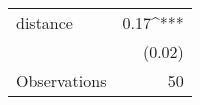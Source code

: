 \begin{tabular}{@{\hspace{5pt}}l@{\hspace{5pt}}D{.}{.}{-2} } 
\toprule
 distance & 0.17^{***} \\ 
  & (0.02) \\ 
\midrule
Observations & 50 \\
\bottomrule
 \end{tabular} 
